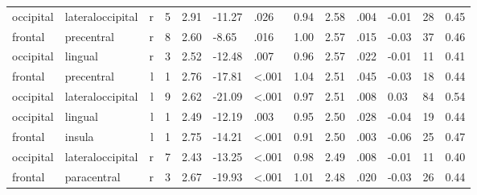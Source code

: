 \documentclass{article}
\begin{document}
\begin{longtable}{llrR{1.3cm}R{1cm}R{1.3cm}R{1cm}R{1cm}R{1.3cm}R{1cm}R{1.8cm}R{1.3cm}R{1.8cm}}
 occipital &          lateraloccipital &    r &         5 &                  2.91 &           -11.27 &               .026 &                               0.94 &                          2.58 &                            .004 &  -0.01 &     28 &      0.45 \\
   frontal &                precentral &    r &         8 &                  2.60 &            -8.65 &               .016 &                               1.00 &                          2.57 &                            .015 &  -0.03 &     37 &      0.46 \\
 occipital &                   lingual &    r &         3 &                  2.52 &           -12.48 &               .007 &                               0.96 &                          2.57 &                            .022 &  -0.01 &     11 &      0.41 \\
   frontal &                precentral &    l &         1 &                  2.76 &           -17.81 &      \textless.001 &                               1.04 &                          2.51 &                            .045 &  -0.03 &     18 &      0.44 \\
 occipital &          lateraloccipital &    l &         9 &                  2.62 &           -21.09 &      \textless.001 &                               0.97 &                          2.51 &                            .008 &   0.03 &     84 &      0.54 \\
 occipital &                   lingual &    l &         1 &                  2.49 &           -12.19 &               .003 &                               0.95 &                          2.50 &                            .028 &  -0.04 &     19 &      0.44 \\
   frontal &                    insula &    l &         1 &                  2.75 &           -14.21 &      \textless.001 &                               0.91 &                          2.50 &                            .003 &  -0.06 &     25 &      0.47 \\
 occipital &          lateraloccipital &    r &         7 &                  2.43 &           -13.25 &      \textless.001 &                               0.98 &                          2.49 &                            .008 &  -0.01 &     11 &      0.40 \\
   frontal &               paracentral &    r &         3 &                  2.67 &           -19.93 &      \textless.001 &                               1.01 &                          2.48 &                            .020 &  -0.03 &     26 &      0.44 \\

\end{longtable}
\end{document}
